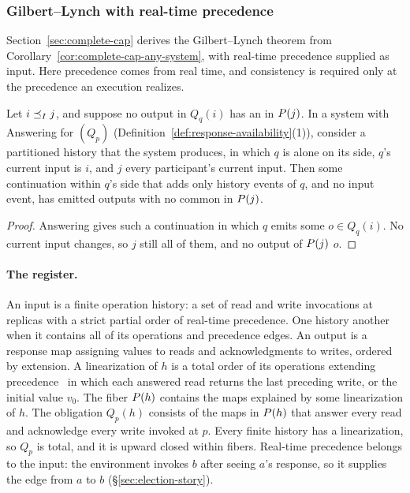 \subsubsection{Gilbert--Lynch with real-time precedence}

Section~\ref{sec:complete-cap} derives the Gilbert--Lynch theorem from
Corollary~\ref{cor:complete-cap-any-system}, with real-time precedence supplied
as input.  Here precedence comes from real time, and consistency is required
only at the precedence an execution realizes.

\begin{lemma}
\label{lem:forced-answer}
Let $i\preceq_I j$, and suppose no output in $Q_q(i)$ has an \outnoun in
$P(j)$.  In a system with Answering for $(Q_p)$
(Definition~\ref{def:response-availability}(1)), consider a partitioned
history that the system produces, in which $q$ is alone on its side,
$q$'s current input is $i$, and $j$ \inrel every participant's current input.
Then some continuation within $q$'s side that adds only history events of $q$,
and no input event, has emitted outputs with no common \outnoun in
$P(j)$.
\end{lemma}

\begin{proof}
Answering gives such a continuation in which $q$ emits some $o\in Q_q(i)$.  No
current input changes, so $j$ still \inrel all of them, and no output of
$P(j)$ \outrel $o$.
\end{proof}

\paragraph{The register.}
An input is a finite operation history: a set of read and write invocations at
replicas with a strict partial order of real-time precedence.  One history
\inrel another when it contains all of its operations and precedence edges.
An output is a response map assigning values to reads and acknowledgments to
writes, ordered by extension.  A linearization of $h$ is a total order of its
operations extending precedence~\cite{herlihy1990linearizability} in which
each answered read returns the last preceding write, or the initial value
$v_0$.  The fiber $P(h)$ contains the maps explained by some
linearization of $h$.  The obligation $Q_p(h)$ consists of the maps in
$P(h)$ that answer every read and acknowledge every write invoked at $p$.
Every finite history has a linearization, so $Q_p$ is total, and it is upward
closed within fibers.  Real-time precedence belongs to the input: the
environment invokes $b$ after seeing $a$'s response, so it supplies the edge
from $a$ to $b$ (\S\ref{sec:election-story}).

